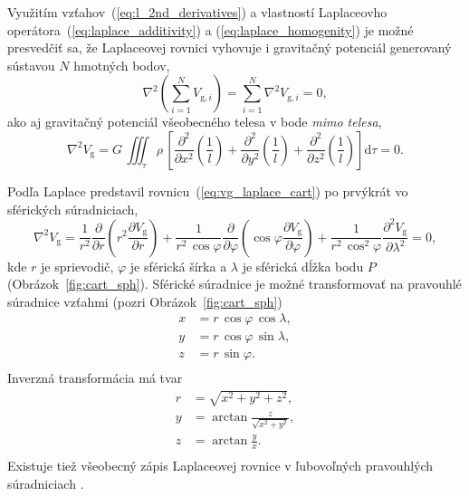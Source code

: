 \documentclass[a4paper, 12pt]{book}
\newcommand{\diff}{\mathrm d}
\newcommand{\gidx}{\mathrm g}
\begin{document}
Využitím vzťahov~(\ref{eq:l_2nd_derivatives}) a vlastností Laplaceovho 
operátora~(\ref{eq:laplace_additivity}) a (\ref{eq:laplace_homogenity}) je 
možné presvedčiť sa, že Laplaceovej rovnici vyhovuje i gravitačný potenciál 
generovaný sústavou $N$ hmotných bodov,
%
\begin{equation}
\nabla^2 \left( \sum_{i = 1}^N V_{\gidx,i} \right) = \sum_{i = 1}^N \nabla^2 
V_{\gidx,i} = 0{,}
\end{equation}
%
ako aj gravitačný potenciál všeobecného telesa v bode \emph{mimo telesa},
%
\begin{equation}
\nabla^2 V_\gidx = G\, \iiint_\tau \rho \, \left[ \frac{\partial^2}{\partial 
x^2}\left(\frac{1}{l}\right) + \frac{\partial^2}{\partial 
y^2}\left(\frac{1}{l}\right) + \frac{\partial^2}{\partial 
z^2}\left(\frac{1}{l}\right) \right] \diff\tau = 0{.}
\end{equation}

Podľa \cite{MacMillan1930} Laplace predstavil 
rovnicu~(\ref{eq:vg_laplace_cart}) po prvýkrát vo sférických súradniciach,
%
\begin{equation}
\label{eq:vg_laplace_sph}
\nabla^2 V_\gidx = \frac{1}{r^2} \frac{\partial}{\partial r} \left( r^2 
\frac{\partial V_\gidx}{\partial r} \right) + \frac{1}{r^2 \, \cos\varphi} 
\frac{\partial}{\partial \varphi} \left( \cos\varphi \frac{\partial 
V_\gidx}{\partial \varphi} \right) + \frac{1}{r^2 \, 
\cos^2\varphi}\frac{\partial^2 V_\gidx}{\partial \lambda^2} = 0{,}
\end{equation}
%
kde $r$ je sprievodič, $\varphi$ je sférická šírka a $\lambda$ je sférická 
dĺžka bodu $P$ (Obrázok~\ref{fig:cart_sph}).  Sférické súradnice je možné 
transformovať na pravouhlé súradnice vzťahmi (pozri Obrázok~\ref{fig:cart_sph})
%
\begin{equation}
\label{eq:sph2cart}
\begin{split}
x &= r \, \cos\varphi \, \cos\lambda{,}\\
y &= r \, \cos\varphi \, \sin\lambda{,}\\
z &= r \, \sin\varphi{.}\\
\end{split}
\end{equation}
%
Inverzná transformácia má tvar
%
\begin{equation}
\label{eq:cart2sph}
\begin{split}
r &= \sqrt{x^2 + y^2 + z^2}{,}\\
y &= \arctan \frac{z}{\sqrt{x^2 + y^2}}{,}\\
z &= \arctan \frac{y}{x}{.}\\
\end{split}
\end{equation}
%
Existuje tiež všeobecný zápis Laplaceovej rovnice v ľubovoľných pravouhlých 
súradniciach \citep[pozri napríklad][]{MoritzPhysicalGeodesy}.
\end{document}
